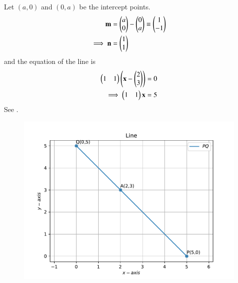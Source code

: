 Let $(a,0)$  and  $(0,a)$ be the intercept points. 
\begin{align}
\mathbf{m} 
        &=   \begin{pmatrix}
		a \\
		0 
		\end{pmatrix} - \begin{pmatrix}
		   0 \\
		   a
		\end{pmatrix}  
        		  \equiv \begin{pmatrix}
                           1 \\
			   -1 
		         \end{pmatrix} 
			 \\
			 \implies
\mathbf{n} &=  \begin{pmatrix}
		     1 \\
		     1
	     \end{pmatrix} 
\end{align}
and 
the equation of the  line is
\begin{align}
	\begin{pmatrix} 1 & 1 \end{pmatrix} \left( \mathbf{ x  - \begin{pmatrix} 2 \\
                                   3
			     \end{pmatrix}
		}\right)  &= 0  \\
\implies		\begin{pmatrix} 1 & 1\end{pmatrix} \mathbf{x}  &= 5 
        \label{eq:11/10/2/12/1}
\end{align}
See  .
\begin{figure}[!h]
	\begin{center}
		\includegraphics[width=\columnwidth]{chapters/11/10/2/12/figs/problem12.pdf}
	\end{center}
\caption{}
\label{fig:11/10/2/12/Fig1}
\end{figure}

